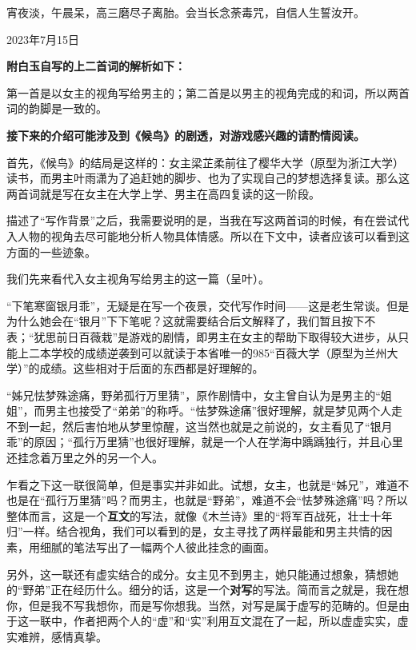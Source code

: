 \documentclass[a5paper]{ctexart}
\begin{document}
	宵夜淡，午晨呆，高三磨尽子离胎。会当长念荼毒咒，自信人生誓汝开。
	\begin{flushright}
		2023年7月15日
	\end{flushright}
	\begin{flushleft}
		\textbf{附白玉自写的上二首词的解析如下：}
	\end{flushleft}
	\begin{small}
		
		第一首是以女主的视角写给男主的；第二首是以男主的视角完成的和词，所以两首词的韵脚是一致的。
		
		\textbf{接下来的介绍可能涉及到《候鸟》的剧透，对游戏感兴趣的请酌情阅读。}
		
		首先，《候鸟》的结局是这样的：女主梁芷柔前往了樱华大学（原型为浙江大学）读书，而男主叶雨潇为了追赶她的脚步、也为了实现自己的梦想选择复读。那么这两首词就是写在女主在大学上学、男主在高四复读的这一阶段。
		
		描述了“写作背景”之后，我需要说明的是，当我在写这两首词的时候，有在尝试代入人物的视角去尽可能地分析人物具体情感。所以在下文中，读者应该可以看到这方面的一些迹象。
		
		我们先来看代入女主视角写给男主的这一篇（呈叶）。
		
		“下笔寒窗银月乖”，无疑是在写一个夜景，交代写作时间——这是老生常谈。但是为什么她会在“银月”下下笔呢？这就需要结合后文解释了，我们暂且按下不表；“犹思前日百薇栽”是游戏的剧情，即男主在女主的帮助下取得较大进步，从只能上二本学校的成绩逆袭到可以就读于本省唯一的985“百薇大学（原型为兰州大学）”的成绩。这些相对于后面的东西都是好理解的。
		
		“姊兄怯梦殊途痛，野弟孤行万里猜”，原作剧情中，女主曾自认为是男主的“姐姐”，而男主也接受了“弟弟”的称呼。“怯梦殊途痛”很好理解，就是梦见两个人走不到一起，然后害怕地从梦里惊醒，这当然也就是之前说的，女主看见了“银月乖”的原因；“孤行万里猜”也很好理解，就是一个人在学海中踽踽独行，并且心里还挂念着万里之外的另一个人。
		
		乍看之下这一联很简单，但是事实并非如此。试想，女主，也就是“姊兄”，难道不也是在“孤行万里猜”吗？而男主，也就是“野弟”，难道不会“怯梦殊途痛”吗？所以整体而言，这是一个\textbf{互文}的写法，就像《木兰诗》里的“将军百战死，壮士十年归”一样。结合视角，我们可以看到的是，女主寻找了两样最能和男主共情的因素，用细腻的笔法写出了一幅两个人彼此挂念的画面。
		
		另外，这一联还有虚实结合的成分。女主见不到男主，她只能通过想象，猜想她的“野弟”正在经历什么。细分的话，这是一个\textbf{对写}的写法。简而言之就是，我在想你，但是我不写我想你，而是写你想我。当然，对写是属于虚写的范畴的。但是由于这一联中，作者把两个人的“虚”和“实”利用互文混在了一起，所以虚虚实实，虚实难辨，感情真挚。
		

\end{small}
\end{document}
